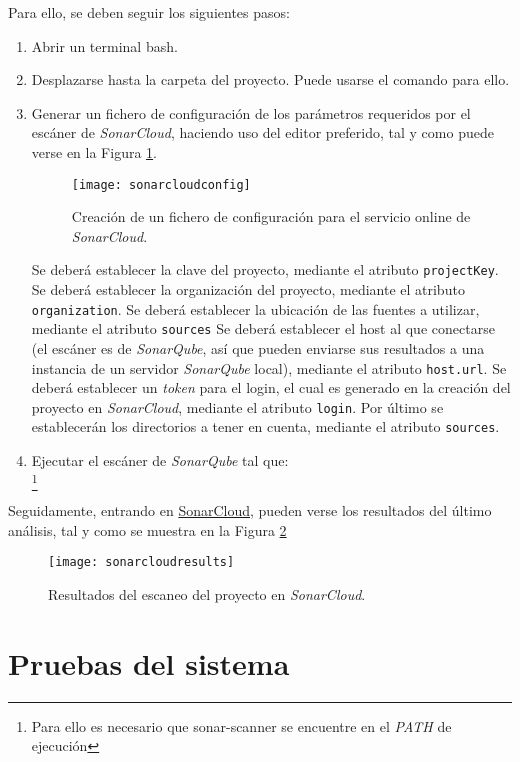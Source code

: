 Para ello, se deben seguir los siguientes pasos: 
\begin{enumerate}
\item Abrir un terminal bash.
\item Desplazarse hasta la carpeta del proyecto. Puede usarse el comando  para ello.
\item Generar un fichero de configuración de los parámetros requeridos por el escáner de \emph{SonarCloud}, haciendo uso del editor preferido, tal y como puede verse en la Figura \ref{fig:sonarcloudconfig}.
\begin{figure}[H]
	\centering
	\texttt{[image: sonarcloudconfig]}
	\caption[Configuración de SonarCloud]{Creación de un fichero de configuración para el servicio online de \emph{SonarCloud}.}\label{fig:sonarcloudconfig}
\end{figure}

Se deberá establecer la clave del proyecto, mediante el atributo \texttt{projectKey}.
Se deberá establecer la organización del proyecto, mediante el atributo \texttt{organization}.
Se deberá establecer la ubicación de las fuentes a utilizar, mediante el atributo \texttt{sources}
Se deberá establecer el host al que conectarse (el escáner es de \emph{SonarQube}, así que pueden enviarse sus resultados a una instancia de un servidor \emph{SonarQube} local), mediante el atributo \texttt{host.url}.
Se deberá establecer un \emph{token} para el login, el cual es generado en la creación del proyecto en \emph{SonarCloud}, mediante el atributo \texttt{login}.
Por último se establecerán los directorios a tener en cuenta, mediante el atributo \texttt{sources}.

\item Ejecutar el escáner de \emph{SonarQube} tal que:\\ \footnote{Para ello es necesario que sonar-scanner se encuentre en el \emph{PATH} de ejecución}
\end{enumerate}

Seguidamente, entrando en \href{https://sonarcloud.io/dashboard?id=GII_0_17.02_SNSI}{SonarCloud}, pueden verse los resultados del último análisis, tal y como se muestra en la Figura \ref{fig:sonarcloudresults}
\begin{figure}[H]
	\centering
	\texttt{[image: sonarcloudresults]}
	\caption[Resultados de SonarCloud]{Resultados del escaneo del proyecto en \emph{SonarCloud}.}\label{fig:sonarcloudresults}
\end{figure}


\section{Pruebas del sistema}



























